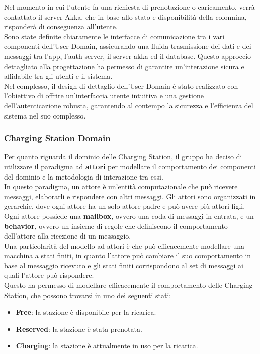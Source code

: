 Nel momento in cui l'utente fa una richiesta di prenotazione o caricamento, verrà contattato il server Akka,
che in base allo stato e disponibilità della colonnina, risponderà di conseguenza all'utente.\\

Sono state definite chiaramente le interfacce di comunicazione tra i vari componenti dell'User Domain,
assicurando una fluida trasmissione dei dati e dei messaggi tra l'app, l'auth server, il server akka ed il database.
Questo approccio dettagliato alla progettazione ha permesso di garantire un'interazione sicura e
affidabile tra gli utenti e il sistema.\\

Nel complesso, il design di dettaglio dell'User Domain è stato realizzato con l'obiettivo di offrire
un'interfaccia utente intuitiva e una gestione dell'autenticazione robusta, garantendo al contempo
la sicurezza e l'efficienza del sistema nel suo complesso.

\subsubsection{Charging Station Domain}
Per quanto riguarda il dominio delle Charging Station, il gruppo ha deciso di utilizzare
il paradigma ad \textbf{attori} per modellare il comportamento dei componenti del dominio e la
metodologia di interazione tra essi. \\

In questo paradigma, un attore è un'entità computazionale che può ricevere messaggi,
elaborarli e rispondere con altri messaggi. Gli attori sono organizzati in gerarchie,
dove ogni attore ha un solo attore padre e può avere più attori figli.\\

Ogni attore possiede una \textbf{mailbox}, ovvero una coda di messaggi in entrata, e un
\textbf{behavior}, ovvero un insieme di regole che definiscono il comportamento dell'attore
alla ricezione di un messaggio.\\

Una particolarità del modello ad attori è che può efficacemente modellare una macchina a
stati finiti, in quanto l'attore può cambiare il suo comportamento in base al messaggio
ricevuto e gli stati finiti corrispondono al set di messaggi ai quali l'attore può rispondere.\\

Questo ha permesso di modellare efficacemente il comportamento delle Charging Station,
che possono trovarsi in uno dei seguenti stati:
\begin{itemize}
    \item \textbf{Free}: la stazione è disponibile per la ricarica.
    \item \textbf{Reserved}: la stazione è stata prenotata.
    \item \textbf{Charging}: la stazione è attualmente in uso per la ricarica.
\end{itemize}

